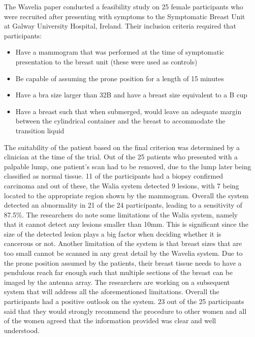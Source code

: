The Wavelia paper \cite{moloneyWaveliaMicrowaveBreast2021} conducted a feasibility study on 25 female
participants who were recruited after presenting with symptoms to the Symptomatic Breast Unit at Galway University
Hospital, Ireland. Their inclusion criteria required that participants:
\begin{itemize}
    \item Have a mammogram that was performed at the time of symptomatic presentation to the breast unit (these were
    used as controls)
    \item Be capable of assuming the prone position for a length of 15 minutes
    \item Have a bra size larger than 32B and have a breast size equivalent to a B cup
    \item Have a breast such that when submerged, would leave an adequate margin between the cylindrical container and
    the breast to accommodate the transition liquid 
\end{itemize}
The suitability of the patient based on the final criterion was determined by a clinician at the time of the trial. Out
of the 25 patients who presented with a palpable lump, one patient's scan had to be removed, due to the lump later being
classified as normal tissue. 11 of the participants had a biopsy confirmed carcinoma and out of these, the Walia system
detected 9 lesions, with 7 being located to the appropriate region shown by the mammogram. Overall the system detected
an abnormality in 21 of the 24 participants, leading to a sensitivity of 87.5\%. The researchers do note some
limitations of the Walia system, namely that it cannot detect any lesions smaller than 10mm. This is significant since
the size of the detected lesion plays a big factor when deciding whether it is cancerous or not. Another limitation of
the system is that breast sizes that are too small cannot be scanned in any great detail by the Wavelia system. Due to
the prone position assumed by the patients, their breast tissue needs to have a pendulous reach far enough such that
multiple sections of the breast can be imaged by the antenna array. The researchers are working on a subsequent system
that will address all the aforementioned limitations. Overall the participants had a positive outlook on the system. 23
out of the 25 participants said that they would strongly recommend the procedure to other women and all of the women
agreed that the information provided was clear and well understood.
